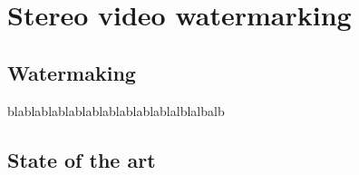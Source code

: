 \chapter{Stereo video watermarking}
\label{wat}

\section{Watermaking}

blablablablablablablablablablalblalbalb

\section{State of the art}